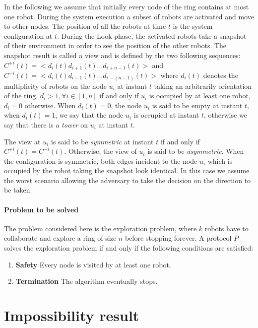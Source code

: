 \documentclass[12pt]{llncs}
\begin{document}
In the following we assume that initially every node  of the ring contains at most one robot. During the system execution a subset of robots are activated and move to other nodes. The position of all the robots at time $t$ is the system configuration at $t$. During the Look phase, the activated robots take a snapshot of their environment in order to see the position of the other robots. The snapshot result is called a view and is defined by the two following sequences:  $C^{+i}(t) =<d_{i}(t) d_{i+1}(t)...d_{i+n-1}(t)>$ and $C^{-i}(t) =<d_{i}(t) d_{i-1}(t)...d_{i-(n-1)}(t)>$ where $d_{i} (t)$ denotes the multiplicity of robots on the node $u_{i}$ at instant $t$ taking an arbitrarily orientation of the ring. $d_{i}>1,  \forall i\in [1,n]$  if and only if $u_{i}$ is occupied by at least one robot, $d_{i}=0$ otherwise. When $d_{i} (t)=0$, the node $u_{i}$ is said to be empty at instant $t$, when $d_{i}(t)=1$, we say that the node $u_{i}$ is occupied at instant $t$, otherwise we say that there is a \textit{tower} on $u_{i}$ at instant $t$. 


The view at $u_{i}$ is said to be \textit{symmetric} at instant $t$ if and only if $C^{+i}(t)=C^{-i}(t)$. Otherwise, the view of $u_{i}$ is said to be \textit{asymmetric}. When the configuration is symmetric, both edges incident to the node $u_{i}$ which is occupied by the robot taking the snapshot look identical. In this case we assume the worst scenario allowing the adversary to take the decision on the direction to be taken. 




\paragraph{\textbf{Problem to be solved}}\label{sec:problem}

The problem considered here is the exploration problem, where $k$ robots have to collaborate and explore a ring of size $n$ before stopping forever. A protocol $P$ solves the exploration problem if and only if the following conditions are satisfied:
\begin{enumerate}
\item{\textbf{Safety}} Every node is visited by at least one robot.
\item {\textbf{Termination}} The algorithm eventually stops.
\end{enumerate}

               
\section{Impossibility result}
\end{document}
